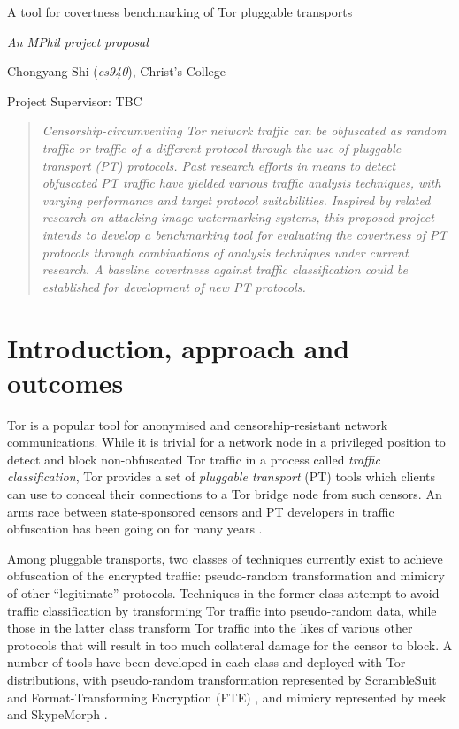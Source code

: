 \documentclass[11pt]{article}
\begin{document}
\centerline{\Large A tool for covertness benchmarking of Tor pluggable transports}
\vspace{2em}
\centerline{\Large \emph{An MPhil project proposal}}
\vspace{2em}
\centerline{\large Chongyang Shi (\emph{cs940}), Christ's College}
\vspace{1em}
\centerline{\large Project Supervisor: TBC}
\vspace{1em}

\begin{abstract}
\textsl{Censorship-circumventing Tor network traffic can be obfuscated as random traffic or traffic of a different protocol through the use of pluggable transport (PT) protocols. Past research efforts in means to detect obfuscated PT traffic have yielded various traffic analysis techniques, with varying performance and target protocol suitabilities. Inspired by related research on attacking image-watermarking systems, this proposed project intends to develop a benchmarking tool for evaluating the covertness of PT protocols through combinations of analysis techniques under current research. A baseline covertness against traffic classification could be established for development of new PT protocols.} 
\end{abstract}

\section{Introduction, approach and outcomes}

Tor is a popular tool for anonymised and censorship-resistant network communications. While it is trivial for a network node in a privileged position to detect and block non-obfuscated Tor traffic \cite[Tb. 6] {bujlow2015independent} in a process called \emph{traffic classification}, Tor provides a set of \emph{pluggable transport} (PT) tools which clients can use to conceal their connections to a Tor bridge node from such censors. An arms race between state-sponsored censors and PT developers in traffic obfuscation has been going on for many years \cite{khattak2014systemization}. 

Among pluggable transports, two classes of techniques currently exist to achieve obfuscation of the encrypted traffic: pseudo-random transformation and mimicry of other ``legitimate'' protocols. Techniques in the former class attempt to avoid traffic classification by transforming Tor traffic into pseudo-random data, while those in the latter class transform Tor traffic into the likes of various other protocols that will result in too much collateral damage for the censor to block. A number of tools have been developed in each class and deployed with Tor distributions, with pseudo-random transformation represented by ScrambleSuit \cite{winter2013scramblesuit} and Format-Transforming Encryption (FTE) \cite{dyer2013protocol}, and mimicry represented by meek \cite{fifield2015blocking} and SkypeMorph \cite{mohajeri2012skypemorph}. 
\end{document}
